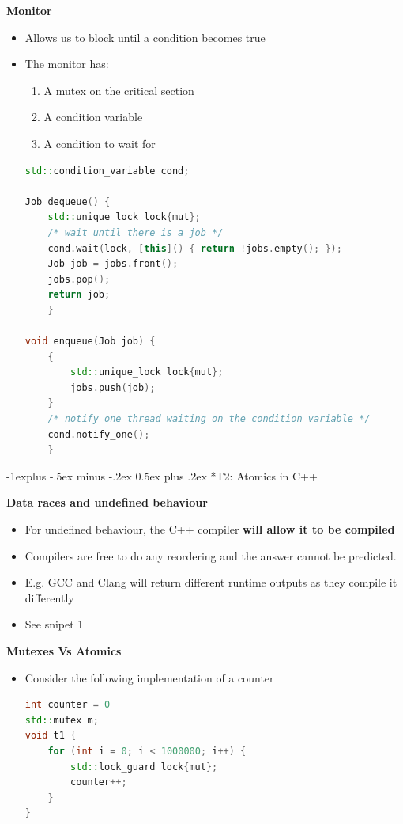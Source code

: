 \documentclass[10pt, landscape]{article}
\makeatletter
\renewcommand{\subsection}{\@startsection{subsection}{2}{0mm}%
                                {-1explus -.5ex minus -.2ex}%
                                {0.5ex plus .2ex}%
                                {\normalfont\normalsize\bfseries}}
\makeatother
\begin{document}
\begin{multicols}{4}
\textbf{Monitor} \\
\begin{itemize}
    \item Allows us to block until a condition becomes true
    \item The monitor has: 
    \begin{enumerate}
        \item A mutex on the critical section
        \item A condition variable
        \item A condition to wait for 
    \end{enumerate}
    \begin{lstlisting}[language=C++, breaklines=true, breakatwhitespace=true]
std::condition_variable cond;

Job dequeue() {
    std::unique_lock lock{mut};
    /* wait until there is a job */
    cond.wait(lock, [this]() { return !jobs.empty(); });
    Job job = jobs.front();
    jobs.pop();
    return job;
    }

void enqueue(Job job) {
    {
        std::unique_lock lock{mut};
        jobs.push(job);
    }
    /* notify one thread waiting on the condition variable */
    cond.notify_one();
    }
    \end{lstlisting}
\end{itemize}


\subsection*{T2: Atomics in C++}

\textbf{Data races and undefined behaviour} \\
\begin{itemize}
    \item For undefined behaviour, the C++ compiler \textbf{will allow it to be compiled}
    \item Compilers are free to do any reordering and the answer cannot be predicted. 
    \item E.g. GCC and Clang will return different runtime outputs as they compile it differently
    \item See snipet 1
\end{itemize}

\textbf{Mutexes Vs Atomics} \\
\begin{itemize}
    \item Consider the following implementation of a counter
    \begin{lstlisting}[language=C++, breaklines=true, breakatwhitespace=true]
int counter = 0
std::mutex m;
void t1 {
    for (int i = 0; i < 1000000; i++) {
        std::lock_guard lock{mut};
        counter++;
    }
}


\end{lstlisting}
\end{itemize}
\end{multicols}
\end{document}
